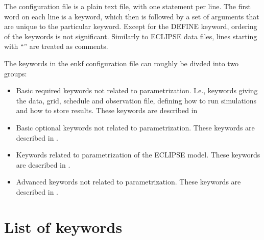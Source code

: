 \documentclass[letterpaper,10pt,english]{sphinxmanual}
\begin{document}
The configuration file is a plain text file, with one statement per line. The
first word on each line is a keyword, which then is followed by a set of
arguments that are unique to the particular keyword. Except for the DEFINE
keyword, ordering of the keywords is not significant. Similarly to ECLIPSE data
files, lines starting with “\textendash{}” are treated as comments.

The keywords in the enkf configuration file can roughly be divded into two
groups:
\begin{itemize}
\item {} 
Basic required keywords not related to parametrization. I.e., keywords giving
the data, grid, schedule and observation file, defining how to run simulations
and how to store results. These keywords are described in {\hyperref[\detokenize{keywords/index:id1}]{}}

\item {} 
Basic optional keywords not related to parametrization. These keywords are
described in {\hyperref[\detokenize{keywords/index:id2}]{}}.

\item {} 
Keywords related to parametrization of the ECLIPSE model. These keywords are
described in {\hyperref[\detokenize{keywords/index:id4}]{}}.

\item {} 
Advanced keywords not related to parametrization. These keywords are described
in {\hyperref[\detokenize{keywords/index:id11}]{}}.

\end{itemize}


\section{List of keywords}
\label{\detokenize{keywords/index:list-of-keywords}}
\end{document}
